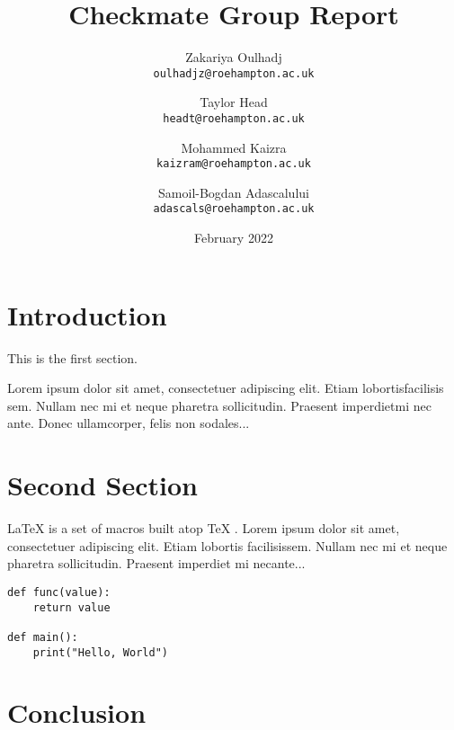 \documentclass{report}
\title{Checkmate Group Report}
\author{
  Zakariya Oulhadj\\
  \texttt{oulhadjz@roehampton.ac.uk}
  \and
  Taylor Head\\
  \texttt{headt@roehampton.ac.uk}
  \and
  Mohammed Kaizra\\
  \texttt{kaizram@roehampton.ac.uk}
  \and
  Samoil-Bogdan Adascalului\\
  \texttt{adascals@roehampton.ac.uk}
}
\date{February 2022}
\begin{document}
\maketitle
\tableofcontents


\section{Introduction}
   
This is the first section.
      
Lorem  ipsum  dolor  sit  amet,  consectetuer  adipiscing  
elit.   Etiam  lobortisfacilisis sem.  Nullam nec mi et 
neque pharetra sollicitudin.  Praesent imperdietmi nec ante. 
Donec ullamcorper, felis non sodales...

\section{Second Section}

\LaTeX{} \cite{latex2e} is a set of macros built atop \TeX{} \cite{texbook}.
Lorem ipsum dolor sit amet, consectetuer adipiscing elit.  
Etiam lobortis facilisissem.  Nullam nec mi et neque pharetra 
sollicitudin.  Praesent imperdiet mi necante...


\begin{verbatim}
def func(value):
    return value

def main():
    print("Hello, World")

\end{verbatim}
         
\section{Conclusion}


\newpage


 
\end{document}
